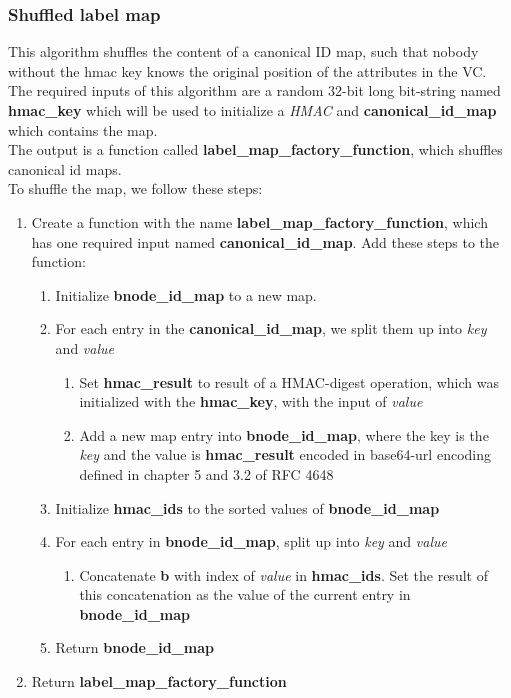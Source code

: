\documentclass[
	a4paper               %
	,BCOR=0mm            %
	,bibliography=totoc   %
	,listof=totoc         %
	,monolingual
	,twoside=false
]{bfhthesis}              %
\begin{document}
\subsubsection{Shuffled label map}
\label{sec:shuffledlabelmap}
This algorithm shuffles the content of a canonical ID map, such that nobody without the hmac key knows the original position of the attributes in the VC.\\

The required inputs of this algorithm are a random 32-bit long bit-string named \\\textbf{hmac\_key} which will be used to initialize a \textit{HMAC} and \textbf{canonical\_id\_map} which contains the map.\\

The output is a function called \textbf{label\_map\_factory\_function}, which shuffles canonical id maps.\\

To shuffle the map, we follow these steps:
\begin{enumerate}
	\item Create a function with the name \textbf{label\_map\_factory\_function}, which has one required input named \textbf{canonical\_id\_map}. Add these steps to the function:
	\begin{enumerate}
		\item Initialize \textbf{bnode\_id\_map} to a new map.
		\item For each entry in the \textbf{canonical\_id\_map}, we split them up into \textit{key} and \textit{value}
		\begin{enumerate}
			\item Set \textbf{hmac\_result} to result of a HMAC-digest operation, which was initialized with the \textbf{hmac\_key}, with the input of \textit{value}
			\item Add a new map entry into \textbf{bnode\_id\_map}, where the key is the \textit{key} and the value is \textbf{hmac\_result} encoded in base64-url encoding defined in chapter 5 and 3.2 of RFC 4648\cite{base64}
		\end{enumerate}
		\item Initialize \textbf{hmac\_ids} to the sorted values of \textbf{bnode\_id\_map}
		\item For each entry in \textbf{bnode\_id\_map}, split up into \textit{key} and \textit{value}
		\begin{enumerate}
			\item Concatenate \textbf{b} with index of \textit{value} in \textbf{hmac\_ids}. Set the result of this concatenation as the value of the current entry in \textbf{bnode\_id\_map}
		\end{enumerate}
		\item Return \textbf{bnode\_id\_map}
	\end{enumerate}
	\item Return \textbf{label\_map\_factory\_function}
\end{enumerate}
\end{document}
